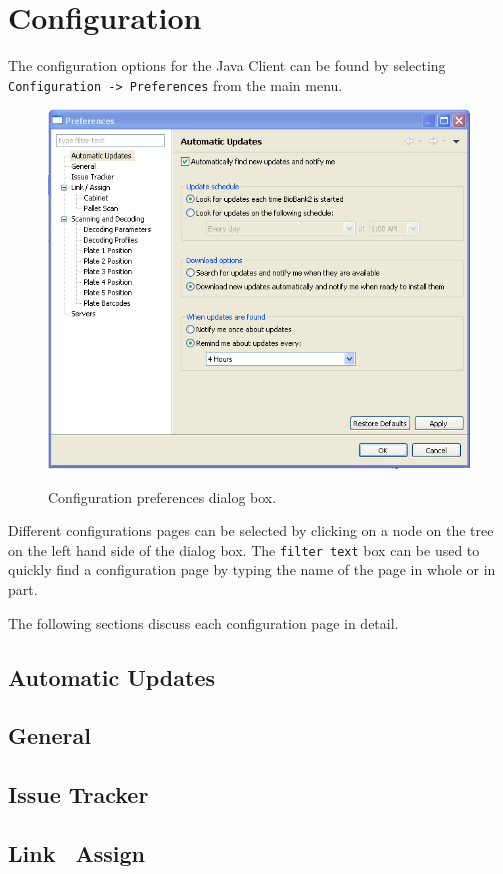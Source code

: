 \chapter{Configuration}
The configuration options for the Java Client can be found by selecting
\texttt{Configuration -> Preferences} from the main menu.
    \begin{figure}[H]
      \centering
      \scalebox{0.5}
      { \includegraphics*{screenshots/configuration/preferences_dialog} }
      \caption{Configuration preferences dialog box.}
      \label{fig:preferences_dialog}
    \end{figure}
Different configurations pages can be selected by clicking on a node on the
tree on the left hand side of the dialog box. The \texttt{filter text} box can
be used to quickly find a configuration page by typing the name of the page in
whole or in part.

The following sections discuss each configuration page in detail.
\section{Automatic Updates}
\section{General}
\section{Issue Tracker}
\section{Link \ Assign}
